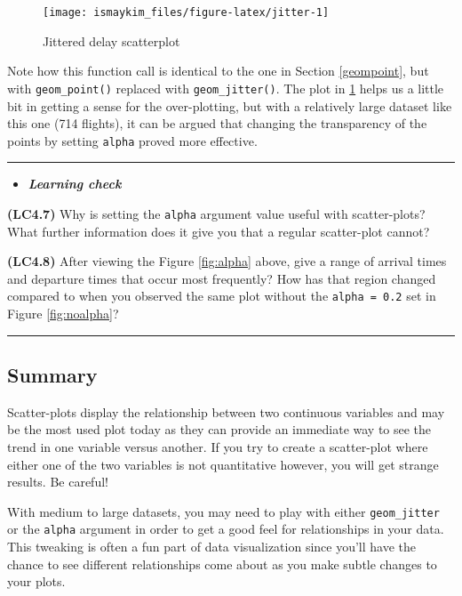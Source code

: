 \documentclass[]{tufte-book}
\let\oldrule=\rule
\renewcommand{\rule}[1]{\oldrule{\linewidth}}
\newenvironment{rmdblock}[1]
  {\begin{shaded*}
  \begin{itemize}
  \renewcommand{\labelitemi}{
    \raisebox{-.7\height}[0pt][0pt]{
    }
  }
  \item
  }
  {
  \end{itemize}
  \end{shaded*}
  }
\newenvironment{learncheck}
  {\begin{rmdblock}{warning}}
  {\end{rmdblock}}
\theoremstyle{definition}
\theoremstyle{definition}
\theoremstyle{remark}
\begin{document}
\begin{figure}

{\centering \texttt{[image: ismaykim\_files/figure-latex/jitter-1]} 

}

\caption[Jittered delay scatterplot]{Jittered delay scatterplot}\label{fig:jitter}
\end{figure}

Note how this function call is identical to the one in Section
\ref{geompoint}, but with \texttt{geom\_point()} replaced with
\texttt{geom\_jitter()}. The plot in \ref{fig:jitter} helps us a little
bit in getting a sense for the over-plotting, but with a relatively
large dataset like this one (714 flights), it can be argued that
changing the transparency of the points by setting \texttt{alpha} proved
more effective.

\begin{center}\rule{0.5\linewidth}{\linethickness}\end{center}

\begin{learncheck}
\textbf{\emph{Learning check}}
\end{learncheck}

\textbf{(LC4.7)} Why is setting the \texttt{alpha} argument value useful
with scatter-plots? What further information does it give you that a
regular scatter-plot cannot?

\textbf{(LC4.8)} After viewing the Figure \ref{fig:alpha} above, give a
range of arrival times and departure times that occur most frequently?
How has that region changed compared to when you observed the same plot
without the \texttt{alpha\ =\ 0.2} set in Figure \ref{fig:noalpha}?

\begin{center}\rule{0.5\linewidth}{\linethickness}\end{center}

\subsection{Summary}\label{summary}

Scatter-plots display the relationship between two continuous variables
and may be the most used plot today as they can provide an immediate way
to see the trend in one variable versus another. If you try to create a
scatter-plot where either one of the two variables is not quantitative
however, you will get strange results. Be careful!

With medium to large datasets, you may need to play with either
\texttt{geom\_jitter} or the \texttt{alpha} argument in order to get a
good feel for relationships in your data. This tweaking is often a fun
part of data visualization since you'll have the chance to see different
relationships come about as you make subtle changes to your plots.
\end{document}
